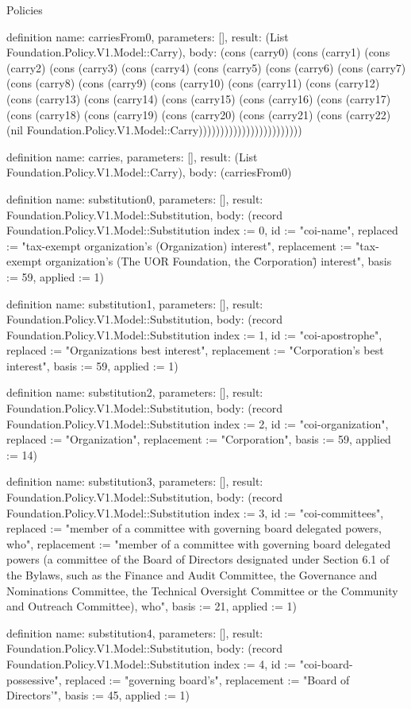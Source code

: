 \begin{lexlean}{Policies}
\begin{semanticmodule}
definition{
  name: carriesFrom0,
  parameters: [],
  result: (List Foundation.Policy.V1.Model::Carry),
  body: (cons (carry0) (cons (carry1) (cons (carry2) (cons (carry3) (cons (carry4) (cons (carry5) (cons (carry6) (cons (carry7) (cons (carry8) (cons (carry9) (cons (carry10) (cons (carry11) (cons (carry12) (cons (carry13) (cons (carry14) (cons (carry15) (cons (carry16) (cons (carry17) (cons (carry18) (cons (carry19) (cons (carry20) (cons (carry21) (cons (carry22) (nil Foundation.Policy.V1.Model::Carry))))))))))))))))))))))))
}

definition{
  name: carries,
  parameters: [],
  result: (List Foundation.Policy.V1.Model::Carry),
  body: (carriesFrom0)
}

definition{
  name: substitution0,
  parameters: [],
  result: Foundation.Policy.V1.Model::Substitution,
  body: (record Foundation.Policy.V1.Model::Substitution {index := 0, id := "coi-name", replaced := "tax-exempt organization's (Organization) interest", replacement := "tax-exempt organization's (The UOR Foundation, the \"Corporation\") interest", basis := 59, applied := 1})
}

definition{
  name: substitution1,
  parameters: [],
  result: Foundation.Policy.V1.Model::Substitution,
  body: (record Foundation.Policy.V1.Model::Substitution {index := 1, id := "coi-apostrophe", replaced := "Organizations best interest", replacement := "Corporation's best interest", basis := 59, applied := 1})
}

definition{
  name: substitution2,
  parameters: [],
  result: Foundation.Policy.V1.Model::Substitution,
  body: (record Foundation.Policy.V1.Model::Substitution {index := 2, id := "coi-organization", replaced := "Organization", replacement := "Corporation", basis := 59, applied := 14})
}

definition{
  name: substitution3,
  parameters: [],
  result: Foundation.Policy.V1.Model::Substitution,
  body: (record Foundation.Policy.V1.Model::Substitution {index := 3, id := "coi-committees", replaced := "member of a committee with governing board delegated powers, who", replacement := "member of a committee with governing board delegated powers (a committee of the Board of Directors designated under Section 6.1 of the Bylaws, such as the Finance and Audit Committee, the Governance and Nominations Committee, the Technical Oversight Committee or the Community and Outreach Committee), who", basis := 21, applied := 1})
}

definition{
  name: substitution4,
  parameters: [],
  result: Foundation.Policy.V1.Model::Substitution,
  body: (record Foundation.Policy.V1.Model::Substitution {index := 4, id := "coi-board-possessive", replaced := "governing board's", replacement := "Board of Directors'", basis := 45, applied := 1})
}


\end{semanticmodule}
\end{lexlean}
